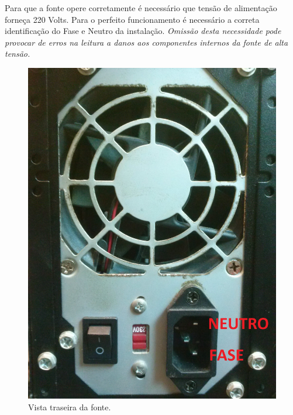 \documentclass[a4paper, 10pt]{article}
\begin{document}

Para que a fonte opere corretamente é necessário que tensão de alimentação 
forneça 220 Volts. Para o perfeito funcionamento é necessário a correta 
identificação do Fase e Neutro da instalação. \textit{Omissão desta necessidade 
pode provocar de erros na leitura a danos aos componentes internos da fonte de alta tensão.}

\begin{figure}[!h]
        \caption{\label{fig_vista_traseira_fonte} Vista traseira da fonte.}
	    \begin{center}
            \includegraphics[scale=0.08]{../fotos/fonte_alimentacao.jpg}
	    \end{center}
\end{figure}
\end{document}
